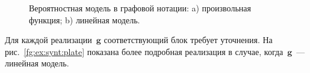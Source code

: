 \documentclass{dissert}
\begin{document}
\begin{figure}[!ht]\center
{}
\caption{Вероятностная модель в графовой нотации: a) произвольная функция; b) линейная модель.}
\end{figure}

Для каждой реализации~$\mathbf{g}$ соответствующий блок требует уточнения. На рис.~\ref{fg:ex:synt:plate} показана более подробная реализация в случае, когда~$\mathbf{g}$~--- линейная модель.
\end{document}
